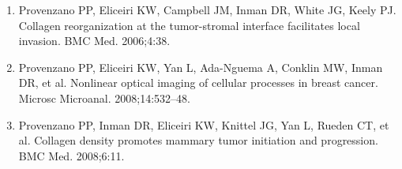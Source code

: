 \documentclass{article}
\begin{document}
\begin{enumerate}

\item Provenzano PP, Eliceiri KW, Campbell JM, Inman DR, White JG, Keely PJ. Collagen reorganization at the tumor-stromal interface facilitates local invasion. BMC Med. 2006;4:38.

\item Provenzano PP, Eliceiri KW, Yan L, Ada-Nguema A, Conklin MW, Inman DR, et al. Nonlinear optical imaging of cellular processes in breast cancer. Microsc Microanal. 2008;14:532–48.

\item Provenzano PP, Inman DR, Eliceiri KW, Knittel JG, Yan L, Rueden CT, et al. Collagen density promotes mammary tumor initiation and progression. BMC Med. 2008;6:11.

\end{enumerate}
\end{document}
